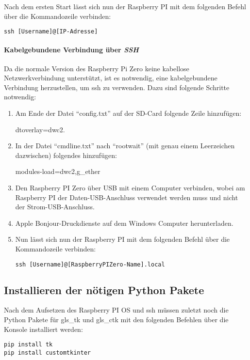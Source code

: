 Nach dem ersten Start lässt sich nun der Raspberry PI mit dem folgenden Befehl über die Kommandozeile verbinden:
\begin{verbatim}
ssh [Username]@[IP-Adresse]
\end{verbatim}

\paragraph{Kabelgebundene Verbindung über \textit{SSH}}
Da die normale Version des Raspberry Pi Zero keine kabellose Netzwerkverbindung unterstützt, ist es notwendig, eine kabelgebundene Verbindung herzustellen, um \ac{ssh} zu verwenden. Dazu sind folgende Schritte notwendig:

\begin{enumerate}
    \item Am Ende der Datei \enquote{config.txt} auf der SD-Card folgende Zeile hinzufügen: \begin{textcode}
    dtoverlay=dwc2.
    \end{textcode}
    \item In der Datei \enquote{cmdline.txt} nach \enquote{rootwait} (mit genau einem Leerzeichen dazwischen) folgendes hinzufügen:
    \begin{textcode}
    modules-load=dwc2,g_ether
    \end{textcode}
    \item Den Raspberry PI Zero über USB mit einem Computer verbinden, wobei am Raspberry PI der Daten-USB-Anschluss verwendet werden muss und nicht der Strom-USB-Anschluss.
    \item Apple Bonjour-Druckdienste auf dem Windows Computer herunterladen.
    \item Nun lässt sich nun der Raspberry PI mit dem folgenden Befehl über die Kommandozeile verbinden:
    \begin{verbatim}
ssh [Username]@[RaspberryPIZero-Name].local
    \end{verbatim}
\end{enumerate}

\subsection{Installieren der nötigen Python Pakete}
Nach dem Aufsetzen des Raspberry PI OS und \ac{ssh} müssen zuletzt noch die Python Pakete für \gls{gls_tk} und \gls{gls_ctk} mit den folgenden Befehlen über die Konsole installiert werden:

\begin{verbatim}
pip install tk
pip install customtkinter
\end{verbatim}
